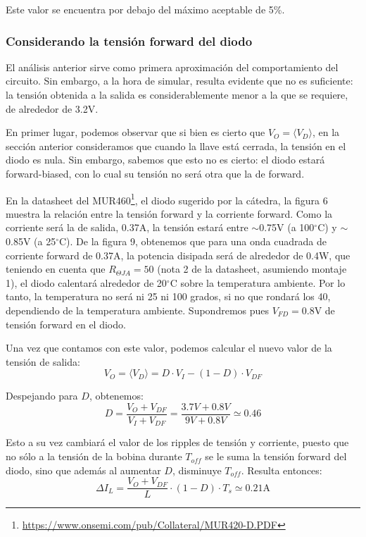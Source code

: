 \documentclass[e4_tp1_main.tex]{subfiles}
\begin{document}
Este valor se encuentra por debajo del m\'aximo aceptable de 5\%.


\subsubsection{Considerando la tensi\'on forward del diodo}

El an\'alisis anterior sirve como primera aproximaci\'on del comportamiento del circuito. Sin embargo, a la hora de simular, resulta evidente que no es suficiente: la tensi\'on obtenida a la salida es considerablemente menor a la que se requiere, de alrededor de 3.2V.

En primer lugar, podemos observar que si bien es cierto que $V_O = \langle V_D \rangle$, en la secci\'on anterior consideramos que cuando la llave est\'a cerrada, la tensi\'on en el diodo es nula. Sin embargo, sabemos que esto no es cierto: el diodo estar\'a forward-biased, con lo cual su tensi\'on no ser\'a otra que la de forward. 

En la datasheet del 
MUR460\footnote{
	\url{https://www.onsemi.com/pub/Collateral/MUR420-D.PDF}
}, el diodo sugerido por la c\'atedra, la figura 6 muestra la relaci\'on entre la tensi\'on forward y la corriente forward. Como la corriente ser\'a la de salida, 0.37A, la tensi\'on estar\'a entre $\sim$0.75V (a 100$^\circ$C) y 
$\sim$0.85V (a 25$^\circ$C). 
De la figura 9, obtenemos que para una onda cuadrada de corriente forward de 0.37A, la potencia disipada ser\'a de alrededor de 0.4W, que teniendo en cuenta que $R_{\Theta JA}=50$ (nota 2 de la datasheet, asumiendo montaje 1), el diodo calentar\'a alrededor de 20$^\circ$C sobre la temperatura ambiente. Por lo tanto, la temperatura no ser\'a ni 25 ni 100 grados, si no que rondar\'a los 40, dependiendo de la temperatura ambiente. Supondremos pues $V_{FD}= 0.8$V de tensi\'on forward en el diodo.

Una vez que contamos con este valor, podemos calcular el nuevo valor de la tensi\'on de salida: 
\begin{equation}
	V_O = \langle V_D \rangle = D \cdot V_I - (1-D) \cdot V_{DF}   
\end{equation}

Despejando para $D$, obtenemos:
\begin{equation}
	D = \frac{V_O + V_{DF}}{V_I + V_{DF}} 
	= \frac{3.7V + 0.8V}{9V + 0.8V} 
	\simeq 0.46 
\end{equation}

Esto a su vez cambiar\'a el valor de los ripples de tensi\'on y corriente, puesto que no s\'olo a la tensi\'on de la bobina durante $T_{off}$ se le suma la tensi\'on forward del diodo, sino que adem\'as al aumentar $D$, disminuye $T_{off}$. Resulta entonces: 
\begin{equation}
	\Delta I_L = \frac{V_O + V_{DF}}{L} \cdot (1-D) \cdot T_s
	\simeq 0.21\text{A}
\end{equation} 
\end{document}
